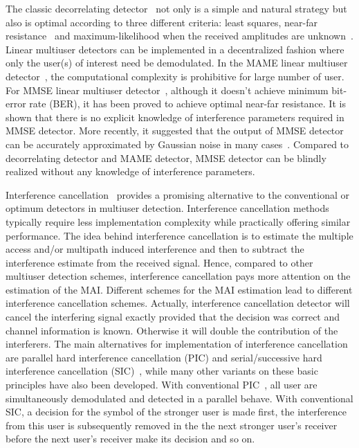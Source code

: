 \documentclass[a4paper,12pt,fleqn]{article}
\begin{document}
The classic decorrelating detector~\cite{Lupa89} not only is a
simple and natural strategy but also is optimal according to three
different criteria: least squares, near-far
resistance~\cite{Verd86} and maximum-likelihood when the received
amplitudes are unknown~\cite{Lupa89}. Linear multiuser detectors
can be implemented in a decentralized fashion where only the
user(s) of interest need be demodulated. In the MAME linear
multiuser detector~\cite{Lupa90}, the computational complexity is
prohibitive for large number of user. For MMSE linear multiuser
detector~\cite{Madhow94}, although it doesn't achieve minimum
bit-error rate (BER), it has been proved to achieve optimal
near-far resistance. It is shown that there is no explicit
knowledge of interference parameters required in MMSE detector.
More recently, it suggested that the output of MMSE detector can
be accurately approximated by Gaussian noise in many
cases~\cite{Poor97a}. Compared to decorrelating detector and MAME
detector, MMSE detector can be blindly realized without any
knowledge of interference parameters.

Interference
cancellation~\cite{Yoon93,Patel94,Wijk95,Divsalar96,Kim98,Bugallo01}
provides a promising alternative to the conventional or optimum
detectors in multiuser detection. Interference cancellation
methods typically require less implementation complexity while
practically offering similar performance. The idea behind
interference cancellation is to estimate the multiple access
and/or multipath induced interference and then to subtract the
interference estimate from the received signal. Hence, compared to
other multiuser detection schemes, interference cancellation pays
more attention on the estimation of the MAI. Different schemes for
the MAI estimation lead to different interference cancellation
schemes. Actually, interference cancellation detector will cancel
the interfering signal exactly provided that the decision was
correct and channel information is known. Otherwise it will double
the contribution of the interferers. The main alternatives for
implementation of interference cancellation are parallel hard
interference cancellation (PIC) and serial/successive hard
interference cancellation (SIC)~\cite{Patel94,Wijk95}, while many
other variants on these basic principles have also been developed.
With conventional PIC~\cite{Divsalar96,Kim98}, all user are
simultaneously demodulated and detected in a parallel behave. With
conventional SIC, a decision for the symbol of the stronger user
is made first, the interference from this user is subsequently
removed in the the next stronger user's receiver before the next
user's receiver make its decision and so on.
\end{document}

